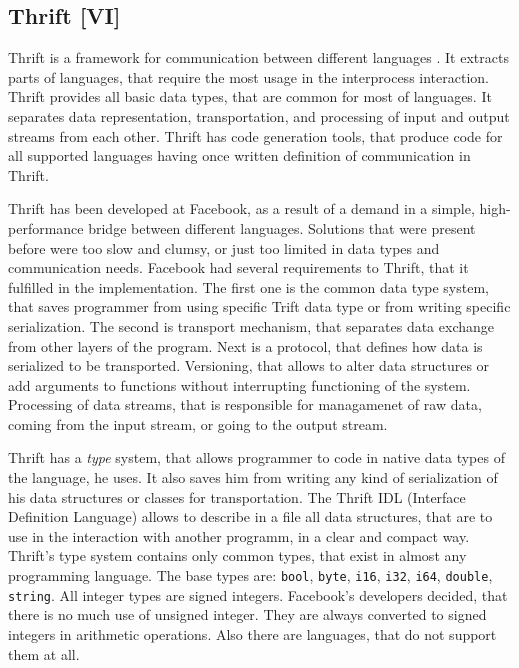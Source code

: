 \subsection{Thrift [VI]}
\label{subs:thrift}

Thrift is a framework for communication between different languages \cite{Slee2007, Thrift}.
It extracts parts of languages, that require the most usage in the interprocess interaction.
Thrift provides all basic data types, that are common for most of languages.
It separates data representation, transportation, and processing of input and output streams from each other.
Thrift has code generation tools, that produce code for all supported languages having once written definition of communication in Thrift.

Thrift has been developed at Facebook, as a result of a demand in a simple, high-performance bridge between different languages.
Solutions that were present before were too slow and clumsy, or just too limited in data types and communication needs.
Facebook had several requirements to Thrift, that it fulfilled in the implementation.
The first one is the common data type system, that saves programmer from using specific Trift data type or from writing specific serialization.
The second is transport mechanism, that separates data exchange from other layers of the program.
Next is a protocol, that defines how data is serialized to be transported.
Versioning, that allows to alter data structures or add arguments to functions without interrupting functioning of the system.
Processing of data streams, that is responsible for managamenet of raw data, coming from the input stream, or going to the output stream. 

Thrift has a \textit{type}  system, that allows programmer to code in native data types of the language, he uses.
It also saves him from writing any kind of serialization of his data structures or classes for transportation.
The Thrift IDL (Interface Definition Language) allows to describe in a file all data structures, that are to use in the interaction with another programm, in a clear and compact way.
Thrift's type system contains only common types, that exist in almost any programming language.
The base types are: \lstinline{bool}, \lstinline{byte}, \lstinline{i16}, \lstinline{i32}, \lstinline{i64}, \lstinline{double}, \lstinline{string}.
All integer types are signed integers.
Facebook's developers decided, that there is no much use of unsigned integer.
They are always converted to signed integers in arithmetic operations.
Also there are languages, that do not support them at all.

